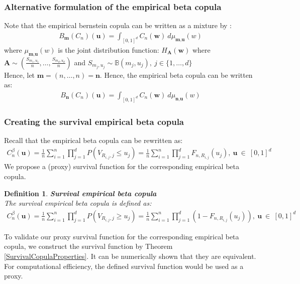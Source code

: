 \documentclass[12pt]{report}
\newtheorem{definition}{Definition}[subsection]
\newcommand{\1}{\mathbf{1}}
\begin{document}
\begin{flushleft}
\newpage
\subsubsection{Alternative formulation of the empirical beta copula}

Note that the empirical bernstein copula can be written as a mixture by \cite{SegersEBC}: 
\begin{align*}
B_{\textbf{m}}(C_{n})(\textbf{u}) = \int_{[0,1]^d} C_{n}(\textbf{w})  \: d\mu_{\textbf{m},\textbf{u}}(w)  
\end{align*}
where $\mu_{\textbf{m},\textbf{u}}(w)$ is the joint distribution function: $H_{\textbf{A}}(\textbf{w})$ where $\textbf{A} \sim \left(\frac{S_{m_{1},u_{1}}}{n}, \dots, \frac{S_{m_{d},u_{d}}}{n}\right)$ and $S_{m_{j},u_{j}} \sim \mathbb{B}(m_{j},u_{j}), \: j \in \{1, \dots, d \}$ \\
\vspace{0.5cm}
Hence, let $\textbf{m} = (n, \dots, n) = \textbf{n}$. Hence, the empirical beta copula can be written as:
\begin{align*}
B_{\textbf{n}}(C_{n})(\textbf{u}) = \int_{[0,1]^d} C_{n}(\textbf{w})  \: d\mu_{\textbf{n},\textbf{u}}(w)  
\end{align*}

\subsubsection{Creating the survival empirical beta copula}

Recall that the empirical beta copula can be rewritten as:
\begin{align*}
C^{\beta}_{n}(\textbf{u}) = \frac{1}{n} \sum\limits_{i = 1}^{n} \prod\limits_{j = 1}^{d} P(V_{R_{i,j},j} \le u_{j}) = \frac{1}{n} \sum\limits_{i = 1}^{n} \prod\limits_{j = 1}^{d} F_{n,R_{i,j}}(u_{j}), \: \textbf{u} \: \in \: [0,1]^{d}
\end{align*}
We propose a (proxy) survival function for the corresponding empirical beta copula.
\begin{definition}\label{SurvivalEBC}
\textbf{Survival empirical beta copula} \\
The survival empirical beta copula is defined as:
\begin{align*}
C^{\beta}_{n}(\textbf{u}) = \frac{1}{n} \sum\limits_{i = 1}^{n} \prod\limits_{j = 1}^{d} P(V_{R_{i,j},j} \ge u_{j}) = \frac{1}{n} \sum\limits_{i = 1}^{n} \prod\limits_{j = 1}^{d} (1 - F_{n,R_{i,j}}(u_{j})), \: \textbf{u} \: \in \: [0,1]^{d}
\end{align*}
\end{definition}
To validate our proxy survival function for the corresponding empirical beta copula, we construct the survival function by Theorem \ref{SurvivalCopulaProperties}. It can be numerically shown that they are equivalent. For computational efficiency, the defined survival function would be used as a proxy.


\end{flushleft}
\end{document}
